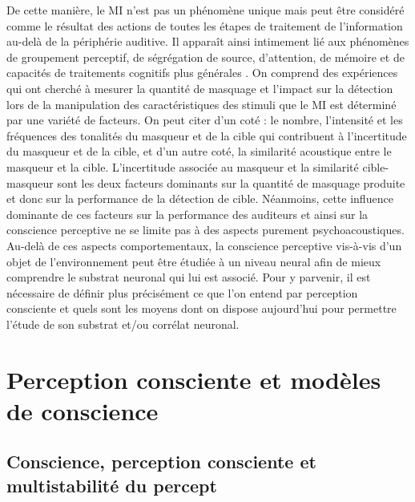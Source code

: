 De cette manière, le MI n’est pas un phénomène unique mais peut être considéré comme le résultat des actions de toutes les étapes de traitement de l’information au-delà de la périphérie auditive. 
Il apparaît ainsi intimement lié aux phénomènes de groupement perceptif, de ségrégation de source, d'attention, de mémoire et de capacités de traitements cognitifs plus générales \citep{kidd2008informationalreview}. 
On comprend des expériences qui ont cherché à mesurer la quantité de masquage et l'impact sur la détection lors de la manipulation des caractéristiques des stimuli que le MI est déterminé par une variété de facteurs. 
On peut citer d'un coté : le nombre, l'intensité et les fréquences des tonalités du masqueur et de la cible qui contribuent à l'incertitude du masqueur et de la cible, et d'un autre coté, la similarité acoustique entre le masqueur et la cible. 
L'incertitude associée au masqueur et la similarité cible-masqueur sont les deux facteurs dominants sur la quantité de masquage produite et donc sur la performance de la détection de cible. 
Néanmoins, cette influence dominante de ces facteurs sur la performance des auditeurs et ainsi sur la conscience perceptive ne se limite pas à des aspects purement psychoacoustiques. 
Au-delà de ces aspects comportementaux, la conscience perceptive vis-à-vis d'un objet de l'environnement peut être étudiée à un niveau neural afin de mieux comprendre le substrat neuronal qui lui est associé. 
Pour y parvenir, il est nécessaire de définir plus précisément ce que l'on entend par perception consciente et quels sont les moyens dont on dispose aujourd'hui pour permettre l'étude de son substrat et/ou corrélat neuronal. 

\section{Perception consciente et modèles de conscience}
\label{perceptionconscientetheorie}

\subsection{Conscience, perception consciente et multistabilité du percept}
\label{conscienceetperceptionconsciente}

